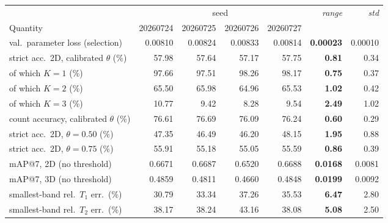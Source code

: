 \begin{tabular}{lrrrrrr}
\toprule
& \multicolumn{4}{c}{seed} & \multirow{2}{*}{\emph{range}} & \multirow{2}{*}{\emph{std}} \\
\cmidrule(lr){2-5}
Quantity & 20260724 & 20260725 & 20260726 & 20260727 & & \\
\midrule
val.\ parameter loss (selection) & 0.00810 & 0.00824 & 0.00833 & 0.00814 & \textbf{0.00023} & 0.00010 \\
strict acc.\ 2D, calibrated $\theta$ (\%) & 57.98 & 57.64 & 57.17 & 57.75 & \textbf{0.81} & 0.34 \\
\quad of which $K = 1$ (\%) & 97.66 & 97.51 & 98.26 & 98.17 & \textbf{0.75} & 0.37 \\
\quad of which $K = 2$ (\%) & 65.50 & 65.98 & 64.96 & 65.53 & \textbf{1.02} & 0.42 \\
\quad of which $K = 3$ (\%) & 10.77 & 9.42 & 8.28 & 9.54 & \textbf{2.49} & 1.02 \\
count accuracy, calibrated $\theta$ (\%) & 76.61 & 76.69 & 76.09 & 76.24 & \textbf{0.60} & 0.29 \\
strict acc.\ 2D, $\theta = 0.50$ (\%) & 47.35 & 46.49 & 46.20 & 48.15 & \textbf{1.95} & 0.88 \\
strict acc.\ 2D, $\theta = 0.75$ (\%) & 55.91 & 55.18 & 55.05 & 55.59 & \textbf{0.86} & 0.39 \\
mAP@7, 2D (no threshold) & 0.6671 & 0.6687 & 0.6520 & 0.6688 & \textbf{0.0168} & 0.0081 \\
mAP@7, 3D (no threshold) & 0.4859 & 0.4811 & 0.4660 & 0.4848 & \textbf{0.0199} & 0.0092 \\
smallest-band rel.\ $T_1$ err.\ (\%) & 30.79 & 33.34 & 37.26 & 35.53 & \textbf{6.47} & 2.80 \\
smallest-band rel.\ $T_2$ err.\ (\%) & 38.17 & 38.24 & 43.16 & 38.08 & \textbf{5.08} & 2.50 \\
\bottomrule
\end{tabular}
